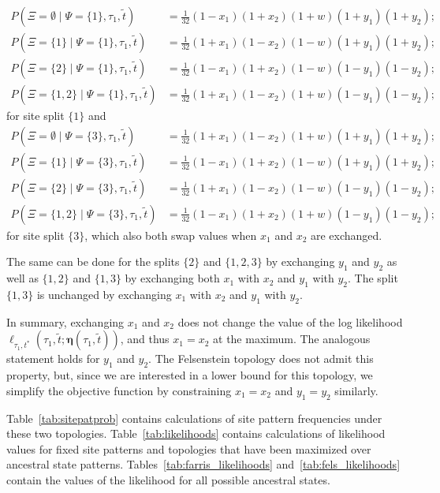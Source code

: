 \documentclass{article}
\newcommand{\fullAncestralSplitPartitions}{\boldsymbol\eta}
\newcommand{\siteSplitRV}{\Psi}
\newcommand{\ancestralSplitRV}{\Xi}
\begin{document}
\begin{align*}
    P(\ancestralSplitRV=\emptyset \mid \siteSplitRV=\{1\}, \tau_1, \tilde{t}) &= \frac{1}{32}(1-x_1)(1+x_2)(1+w)(1+y_1)(1+y_2); \\
    P(\ancestralSplitRV=\{1\} \mid \siteSplitRV=\{1\}, \tau_1, \tilde{t}) &= \frac{1}{32}(1+x_1)(1-x_2)(1-w)(1+y_1)(1+y_2); \\
    P(\ancestralSplitRV=\{2\} \mid \siteSplitRV=\{1\}, \tau_1, \tilde{t}) &= \frac{1}{32}(1-x_1)(1+x_2)(1-w)(1-y_1)(1-y_2); \\
    P(\ancestralSplitRV=\{1,2\} \mid \siteSplitRV=\{1\}, \tau_1, \tilde{t}) &= \frac{1}{32}(1+x_1)(1-x_2)(1+w)(1-y_1)(1-y_2);
\end{align*}
for site split $\{1\}$ and
\begin{align*}
        P(\ancestralSplitRV=\emptyset \mid \siteSplitRV=\{3\}, \tau_1, \tilde{t}) &= \frac{1}{32}(1+x_1)(1-x_2)(1+w)(1+y_1)(1+y_2); \\
    P(\ancestralSplitRV=\{1\} \mid \siteSplitRV=\{3\}, \tau_1, \tilde{t}) &= \frac{1}{32}(1-x_1)(1+x_2)(1-w)(1+y_1)(1+y_2); \\
    P(\ancestralSplitRV=\{2\} \mid \siteSplitRV=\{3\}, \tau_1, \tilde{t}) &= \frac{1}{32}(1+x_1)(1-x_2)(1-w)(1-y_1)(1-y_2); \\
    P(\ancestralSplitRV=\{1,2\} \mid \siteSplitRV=\{3\}, \tau_1, \tilde{t}) &= \frac{1}{32}(1-x_1)(1+x_2)(1+w)(1-y_1)(1-y_2);
\end{align*}
for site split $\{3\}$, which also both swap values when $x_1$ and $x_2$ are exchanged.

The same can be done for the splits $\{2\}$ and $\{1,2,3\}$ by exchanging $y_1$ and $y_2$ as well as $\{1,2\}$ and $\{1,3\}$ by exchanging both $x_1$ with $x_2$ and $y_1$ with $y_2$.
The split $\{1,3\}$ is unchanged by exchanging $x_1$ with $x_2$ and $y_1$ with $y_2$.

In summary, exchanging $x_1$ and $x_2$ does not change the value of the log likelihood $\ell_{\tau_1,t^*}(\tau_1, \tilde{t}; \fullAncestralSplitPartitions(\tau_1,\tilde{t}))$, and thus $x_1=x_2$ at the maximum.
The analogous statement holds for $y_1$ and $y_2$.
The Felsenstein topology does not admit this property, but, since we are interested in a lower bound for this topology, we simplify the objective function by constraining $x_1=x_2$ and $y_1=y_2$ similarly.

Table~\ref{tab:sitepatprob} contains calculations of site pattern frequencies under these two topologies.
Table~\ref{tab:likelihoods} contains calculations of likelihood values for fixed site patterns and topologies that have been maximized over ancestral state patterns.
Tables~\ref{tab:farris_likelihoods} and~\ref{tab:fels_likelihoods} contain the values of the likelihood for all possible ancestral states.
\end{document}
